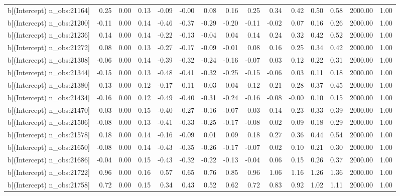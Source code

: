 \begin{table}[ht]
\begin{tabular}{rrrrrrrrrrrrrrr}
  b[(Intercept) n\_obs:21164] & 0.25 & 0.00 & 0.13 & -0.09 & -0.00 & 0.08 & 0.16 & 0.25 & 0.34 & 0.42 & 0.50 & 0.58 & 2000.00 & 1.00 \\ 
  b[(Intercept) n\_obs:21200] & -0.11 & 0.00 & 0.14 & -0.46 & -0.37 & -0.29 & -0.20 & -0.11 & -0.02 & 0.07 & 0.16 & 0.26 & 2000.00 & 1.00 \\ 
  b[(Intercept) n\_obs:21236] & 0.14 & 0.00 & 0.14 & -0.22 & -0.13 & -0.04 & 0.04 & 0.14 & 0.24 & 0.32 & 0.42 & 0.52 & 2000.00 & 1.00 \\ 
  b[(Intercept) n\_obs:21272] & 0.08 & 0.00 & 0.13 & -0.27 & -0.17 & -0.09 & -0.01 & 0.08 & 0.16 & 0.25 & 0.34 & 0.42 & 2000.00 & 1.00 \\ 
  b[(Intercept) n\_obs:21308] & -0.06 & 0.00 & 0.14 & -0.39 & -0.32 & -0.24 & -0.16 & -0.07 & 0.03 & 0.12 & 0.22 & 0.31 & 2000.00 & 1.00 \\ 
  b[(Intercept) n\_obs:21344] & -0.15 & 0.00 & 0.13 & -0.48 & -0.41 & -0.32 & -0.25 & -0.15 & -0.06 & 0.03 & 0.11 & 0.18 & 2000.00 & 1.00 \\ 
  b[(Intercept) n\_obs:21380] & 0.13 & 0.00 & 0.12 & -0.17 & -0.11 & -0.03 & 0.04 & 0.12 & 0.21 & 0.28 & 0.37 & 0.45 & 2000.00 & 1.00 \\ 
  b[(Intercept) n\_obs:21434] & -0.16 & 0.00 & 0.12 & -0.49 & -0.40 & -0.31 & -0.24 & -0.16 & -0.08 & -0.00 & 0.10 & 0.15 & 2000.00 & 1.00 \\ 
  b[(Intercept) n\_obs:21470] & 0.03 & 0.00 & 0.15 & -0.40 & -0.27 & -0.16 & -0.07 & 0.03 & 0.14 & 0.23 & 0.33 & 0.39 & 2000.00 & 1.00 \\ 
  b[(Intercept) n\_obs:21506] & -0.08 & 0.00 & 0.13 & -0.41 & -0.33 & -0.25 & -0.17 & -0.08 & 0.02 & 0.09 & 0.18 & 0.29 & 2000.00 & 1.00 \\ 
  b[(Intercept) n\_obs:21578] & 0.18 & 0.00 & 0.14 & -0.16 & -0.09 & 0.01 & 0.09 & 0.18 & 0.27 & 0.36 & 0.44 & 0.54 & 2000.00 & 1.00 \\ 
  b[(Intercept) n\_obs:21650] & -0.08 & 0.00 & 0.14 & -0.43 & -0.35 & -0.26 & -0.17 & -0.07 & 0.02 & 0.10 & 0.21 & 0.30 & 2000.00 & 1.00 \\ 
  b[(Intercept) n\_obs:21686] & -0.04 & 0.00 & 0.15 & -0.43 & -0.32 & -0.22 & -0.13 & -0.04 & 0.06 & 0.15 & 0.26 & 0.37 & 2000.00 & 1.00 \\ 
  b[(Intercept) n\_obs:21722] & 0.96 & 0.00 & 0.16 & 0.57 & 0.65 & 0.76 & 0.85 & 0.96 & 1.06 & 1.16 & 1.26 & 1.36 & 2000.00 & 1.00 \\ 
  b[(Intercept) n\_obs:21758] & 0.72 & 0.00 & 0.15 & 0.34 & 0.43 & 0.52 & 0.62 & 0.72 & 0.83 & 0.92 & 1.02 & 1.11 & 2000.00 & 1.00 \\ 

\end{tabular}
\end{table}

